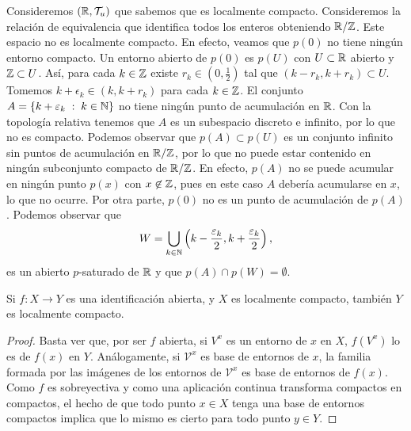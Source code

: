 \begin{eg}
Consideremos $\displaystyle \left(\mathbb{R}, \mathcal{T}_{u}\right) $ que sabemos que es localmente compacto. Consideremos la relación de equivalencia que identifica todos los enteros obteniendo $\displaystyle \mathbb{R} / \mathbb{Z} $. Este espacio no es localmente compacto. En efecto, veamos que $\displaystyle p\left(0\right) $ no tiene ningún entorno compacto. Un entorno abierto de $\displaystyle p\left(0\right) $ es $\displaystyle p\left(U\right) $ con $\displaystyle U\subset \mathbb{R} $ abierto y $\displaystyle \mathbb{Z}\subset U $. 
Así, para cada $\displaystyle k \in \mathbb{Z} $ existe $\displaystyle r_{k}\in\left(0, \frac{1}{2}\right) $ tal que $\displaystyle \left(k-r_{k}, k + r_{k}\right)\subset U $. Tomemos $\displaystyle k + \epsilon _{k}\in \left(k , k + r_{k}\right) $ para cada $\displaystyle k \in \mathbb{Z} $. 
El conjunto $\displaystyle A = \left\{ k + \varepsilon _{k} \; : \; k \in \mathbb{N}\right\}  $ no tiene ningún punto de acumulación en $\displaystyle \mathbb{R} $. Con la topología relativa tenemos que $\displaystyle A $ es un subespacio discreto e infinito, por lo que no es compacto. 
Podemos observar que $\displaystyle p\left(A\right)\subset p\left(U\right) $ es un conjunto infinito sin puntos de acumulación en $\displaystyle \mathbb{R}/ \mathbb{Z} $, por lo que no puede estar contenido en ningún subconjunto compacto de $\displaystyle \mathbb{R} / \mathbb{Z} $. En efecto, $\displaystyle p\left(A\right) $ no se puede acumular en ningún punto $\displaystyle p\left(x\right) $ con $\displaystyle x \not\in \mathbb{Z} $, pues en este caso $\displaystyle A $ debería acumularse en $\displaystyle x $, lo que no ocurre. 
Por otra parte, $\displaystyle p\left(0\right) $ no es un punto de acumulación de $\displaystyle p\left(A\right) $. Podemos observar que 
\[W = \bigcup_{k \in \mathbb{N}}\left(k-\frac{\varepsilon _{k}}{2}, k + \frac{\varepsilon_{k}}{2}\right) ,\]
es un abierto $\displaystyle p $-saturado de $\displaystyle \mathbb{R} $ y que $\displaystyle p\left(A\right)\cap p\left(W\right)= \emptyset $.
\end{eg}
\begin{prop}
Si $\displaystyle f : X \to Y $ es una identificación abierta, y $\displaystyle X $ es localmente compacto, también $\displaystyle Y $ es localmente compacto.
\end{prop}
\begin{proof}
Basta ver que, por ser $\displaystyle f $ abierta, si $\displaystyle V^{x} $ es un entorno de $\displaystyle x $ en $\displaystyle X $, $\displaystyle f\left(V^{x}\right) $ lo es de $\displaystyle f\left(x\right) $ en $\displaystyle Y $. Análogamente, si $\displaystyle \mathcal{V}^{x} $ es base de entornos de $\displaystyle x $, la familia formada por las imágenes de los entornos de $\displaystyle \mathcal{V}^{x} $ es base de entornos de $\displaystyle f\left(x\right) $. 
Como $\displaystyle f $ es sobreyectiva y como una aplicación continua transforma compactos en compactos, el hecho de que todo punto $\displaystyle x \in X $ tenga una base de entornos compactos implica que lo mismo es cierto para todo punto $\displaystyle y \in Y $.
\end{proof}
